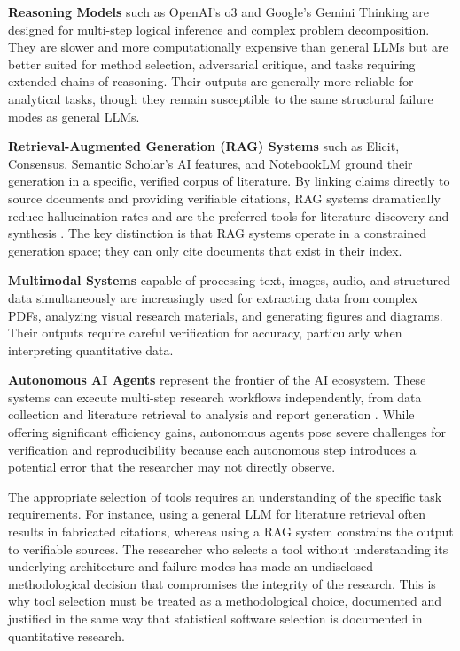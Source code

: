 \documentclass[12pt, a4paper]{article}
\begin{document}
\textbf{Reasoning Models} such as OpenAI's o3 and Google's Gemini Thinking are designed for multi-step logical inference and complex problem decomposition. They are slower and more computationally expensive than general LLMs but are better suited for method selection, adversarial critique, and tasks requiring extended chains of reasoning. Their outputs are generally more reliable for analytical tasks, though they remain susceptible to the same structural failure modes as general LLMs.

\textbf{Retrieval-Augmented Generation (RAG) Systems} such as Elicit, Consensus, Semantic Scholar's AI features, and NotebookLM ground their generation in a specific, verified corpus of literature. By linking claims directly to source documents and providing verifiable citations, RAG systems dramatically reduce hallucination rates and are the preferred tools for literature discovery and synthesis \citep{li2025enhancing}. The key distinction is that RAG systems operate in a constrained generation space; they can only cite documents that exist in their index.

\textbf{Multimodal Systems} capable of processing text, images, audio, and structured data simultaneously are increasingly used for extracting data from complex PDFs, analyzing visual research materials, and generating figures and diagrams. Their outputs require careful verification for accuracy, particularly when interpreting quantitative data.

\textbf{Autonomous AI Agents} represent the frontier of the AI ecosystem. These systems can execute multi-step research workflows independently, from data collection and literature retrieval to analysis and report generation \citep{nature2025agents, gottweis2026coscientist}. While offering significant efficiency gains, autonomous agents pose severe challenges for verification and reproducibility because each autonomous step introduces a potential error that the researcher may not directly observe.

The appropriate selection of tools requires an understanding of the specific task requirements. For instance, using a general LLM for literature retrieval often results in fabricated citations, whereas using a RAG system constrains the output to verifiable sources. The researcher who selects a tool without understanding its underlying architecture and failure modes has made an undisclosed methodological decision that compromises the integrity of the research. This is why tool selection must be treated as a methodological choice, documented and justified in the same way that statistical software selection is documented in quantitative research.
\end{document}
